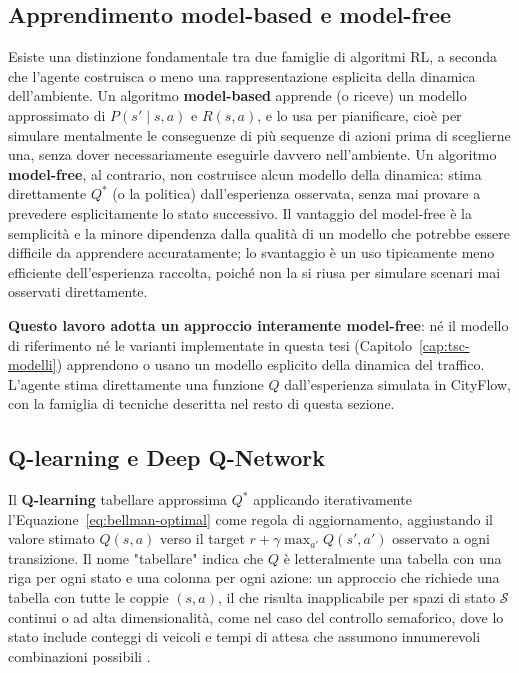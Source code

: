 \subsection{Apprendimento model-based e model-free}
\label{subsec:model-free}

Esiste una distinzione fondamentale tra due famiglie di algoritmi RL, a
seconda che l'agente costruisca o meno una rappresentazione esplicita
della dinamica dell'ambiente. Un algoritmo \textbf{model-based} apprende
(o riceve) un modello approssimato di $P(s'\mid s,a)$ e $R(s,a)$, e lo usa
per pianificare, cioè per simulare mentalmente le conseguenze di più
sequenze di azioni prima di sceglierne una, senza dover necessariamente
eseguirle davvero nell'ambiente. Un algoritmo \textbf{model-free}, al
contrario, non costruisce alcun modello della dinamica: stima
direttamente $Q^*$ (o la politica) dall'esperienza osservata, senza mai
provare a prevedere esplicitamente lo stato successivo. Il vantaggio del
model-free è la semplicità e la minore dipendenza dalla qualità di un
modello che potrebbe essere difficile da apprendere accuratamente; lo
svantaggio è un uso tipicamente meno efficiente dell'esperienza raccolta,
poiché non la si riusa per simulare scenari mai osservati direttamente.

\textbf{Questo lavoro adotta un approccio interamente model-free}: né il
modello di riferimento \citep{wang2022metastgat} né le varianti
implementate in questa tesi (Capitolo~\ref{cap:tsc-modelli}) apprendono o
usano un modello esplicito della dinamica del traffico. L'agente stima
direttamente una funzione $Q$ dall'esperienza simulata in CityFlow, con la
famiglia di tecniche descritta nel resto di questa sezione.

\subsection{Q-learning e Deep Q-Network}

Il \textbf{Q-learning} tabellare approssima $Q^*$ applicando
iterativamente l'Equazione~\ref{eq:bellman-optimal} come regola di
aggiornamento, aggiustando il valore stimato $Q(s,a)$ verso il target $r +
\gamma \max_{a'} Q(s',a')$ osservato a ogni transizione. Il nome
"tabellare" indica che $Q$ è letteralmente una tabella con una riga per
ogni stato e una colonna per ogni azione: un approccio che richiede una
tabella con tutte le coppie $(s,a)$, il che risulta inapplicabile per
spazi di stato $\mathcal{S}$ continui o ad alta dimensionalità, come nel
caso del controllo semaforico, dove lo stato include conteggi di veicoli
e tempi di attesa che assumono innumerevoli combinazioni possibili
\citep{li2018drlsurvey}.

